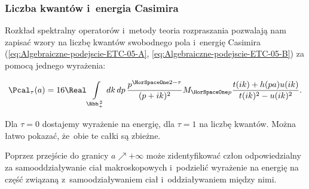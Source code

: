 \documentclass[10pt,t]{beamer}
\begin{document}
\begin{frame}
  \frametitle{Liczba kwantów i~energia Casimira}


  Rozkład spektralny operatorów i~metody teoria rozpraszania pozwalają nam
  zapisać wzory na liczbę kwantów swobodnego pola i~energię Casimira
  (\eqref{eq:Algebraiczne-podejscie-ETC-05-A},
  \eqref{eq:Algebraiczne-podejscie-ETC-05-B})
  za pomocą jednego wyrażenia:

  \vspace{-1.1em}



  \begin{equation}
    \label{eq:Pole-skalarne-ETC-04}
    \Pcal_{ \tau }( a ) =
    16 \Real \int\limits_{ \Rbb_{ + }^{ \, 2 } } dk \, dp \,
    \frac{ p^{ \HorSpaceOne 2 - \tau } }{ ( p + i k )^{ 2 } } M_{ \HorSpaceOne p }
    \frac{ t( i k ) + h( p a ) u( i k ) }{ t( i k )^{ 2 } - u( i k )^{ 2 } }.
  \end{equation}

  \vspace{-1.3em}



  Dla $\tau = 0$ dostajemy wyrażenie na energię, dla $\tau = 1$ na liczbę
  kwantów. Można łatwo pokazać, że~obie te całki są zbieżne.

  Poprzez przejście do granicy $a \nearrow +\infty$ może zidentyfikować człon
  odpowiedzialny za samooddziaływanie ciał makroskopowych i~podzielić
  wyrażenie na energię na część związaną z~samoodziaływaniem ciał
  i~oddziaływaniem między nimi.

\end{frame}
\end{document}

